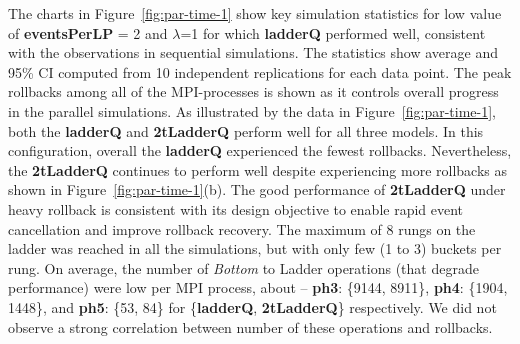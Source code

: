 The charts in Figure~\ref{fig:par-time-1} show key simulation statistics for low value of \textbf{eventsPerLP} = 2 and $\lambda$=1 for
which \textbf{ladderQ} performed well, consistent with the observations in sequential simulations. The statistics show average and 95\% CI
computed from 10 independent replications for each data point. The peak rollbacks among all of the MPI-processes is shown as it controls
overall progress in the parallel simulations. As illustrated by the data in Figure~\ref{fig:par-time-1}, both the \textbf{ladderQ} and
\textbf{2tLadderQ} perform well for all three models. In this configuration, overall the \textbf{ladderQ} experienced the fewest
rollbacks. Nevertheless, the \textbf{2tLadderQ} continues to perform well despite experiencing more rollbacks as shown in
Figure~\ref{fig:par-time-1}(b). The good performance of \textbf{2tLadderQ} under heavy rollback is consistent with its design objective to enable rapid event cancellation and improve rollback recovery. The maximum of 8 rungs on the ladder was reached in all the simulations, but with only few (1 to 3) buckets per rung. On average, the number of \emph{Bottom} to Ladder operations (that degrade performance) were low
per MPI process, about -- \textbf{ph3}: \{9144, 8911\}, \textbf{ph4}: \{1904, 1448\}, and \textbf{ph5}: \{53, 84\} for \{\textbf{ladderQ}, \textbf{2tLadderQ}\} respectively. We did not observe a strong correlation between number of these operations and rollbacks.

